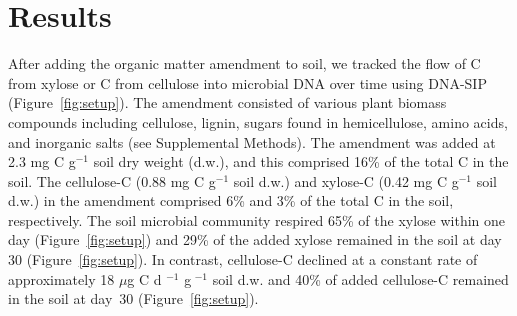 \section{Results}
After adding the organic matter amendment to soil, we tracked the flow of
C from xylose or C from cellulose into microbial DNA over time using DNA-SIP
(Figure~\ref{fig:setup}). The amendment consisted of various plant biomass
compounds including cellulose, lignin, sugars found in hemicellulose, amino
acids, and inorganic salts (see Supplemental Methods). The amendment was added
at 2.3 mg C g$^{-1}$ soil dry weight (d.w.), and this comprised 16\% of the
total C in the soil. The cellulose-C (0.88 mg C g$^{-1}$ soil d.w.) and
xylose-C (0.42 mg C g$^{-1}$ soil d.w.) in the amendment comprised 6\% and 3\%
of the total C in the soil, respectively. The soil microbial community respired
65\% of the xylose within one day (Figure~\ref{fig:setup}) and 29\% of the
added xylose remained in the soil at day 30 (Figure~\ref{fig:setup}). In
contrast, cellulose-C declined at a constant rate of approximately 18 $\mu$g
C d $^{-1}$ g $^{-1}$ soil d.w. and 40\% of added cellulose-C remained in the
soil at day~30 (Figure~\ref{fig:setup}).

